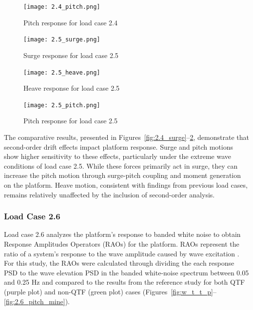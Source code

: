 \documentclass[a4paper, 11pt]{article}
\begin{document}
\begin{figure}[H]
    \begin{minipage}{0.49\textwidth}
        \centering
        \texttt{[image: 2.4\_pitch.png]}
        \caption{\small Pitch response for load case 2.4} 
        \label{fig:2.4_pitch}
    \end{minipage}
    \hfill
    \begin{minipage}{0.49\textwidth}
        \centering
        \vspace{-0.3cm}
        \texttt{[image: 2.5\_surge.png]}
        \caption{\small Surge response for load case 2.5}
        \label{fig:2.5_surge}
    \end{minipage}
\end{figure}

\begin{figure}[H]
    \begin{minipage}{0.49\textwidth}
        \centering
        \texttt{[image: 2.5\_heave.png]}
        \caption{\small Heave response for load case 2.5}
        \label{fig:2.5_heave}
    \end{minipage}
    \hfill
    \begin{minipage}{0.49\textwidth}
        \centering
        \vspace{-0.3cm}
        \texttt{[image: 2.5\_pitch.png]}
        \caption{\small Pitch response for load case 2.5}
        \label{fig:2.5_pitch}
    \end{minipage}
\end{figure}

The comparative results, presented in Figures~\ref{fig:2.4_surge}--\ref{fig:2.5_pitch}, demonstrate that second-order drift effects impact platform response. Surge and pitch motions show higher sensitivity to these effects, particularly under the extreme wave conditions of load case 2.5. While these forces primarily act in surge, they can increase the pitch motion through surge-pitch coupling and moment generation on the platform. Heave motion, consistent with findings from previous load cases, remains relatively unaffected by the inclusion of second-order analysis.

\subsubsection{Load Case 2.6}
\hspace*{0.5cm}Load case 2.6 analyzes the platform's response to banded white noise to obtain Response Amplitudes Operators (RAOs) for the platform. RAOs represent the ratio of a system's response to the wave amplitude caused by wave excitation \cite{RAO}. For this study, the RAOs were calculated through dividing the each response PSD to the wave elevation PSD in the banded white-noise spectrum between 0.05 and 0.25 Hz and compared to the results from the reference study for both QTF (purple plot) and non-QTF (green plot) cases (Figures~\ref{fig:w_t_t_p}--\ref{fig:2.6_pitch_mine}).
\end{document}
